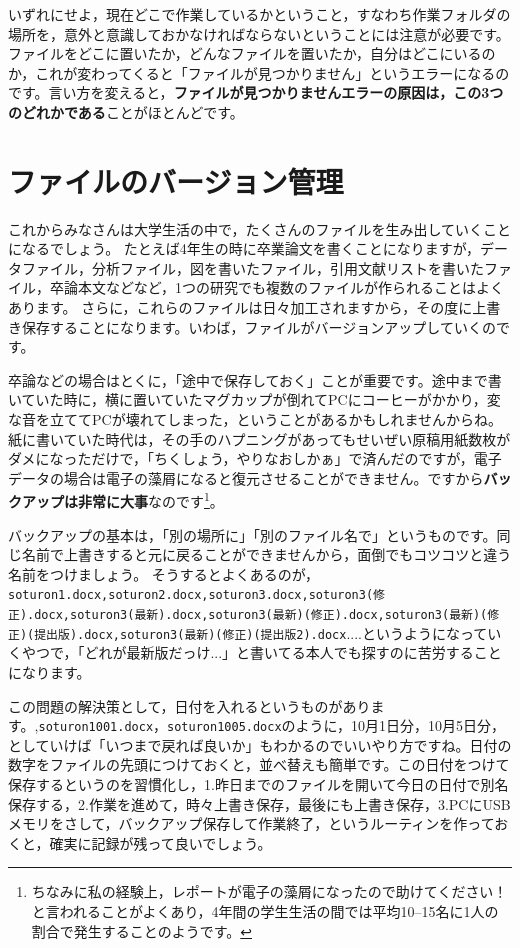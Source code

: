 \documentclass{ltjsbook}
\begin{document}
いずれにせよ，現在どこで作業しているかということ，すなわち作業フォルダの場所を，意外と意識しておかなければならないということには注意が必要です。ファイルをどこに置いたか，どんなファイルを置いたか，自分はどこにいるのか，これが変わってくると「ファイルが見つかりません」というエラーになるのです。言い方を変えると，\textbf{ファイルが見つかりませんエラーの原因は，この3つのどれかである}ことがほとんどです。

\section{ファイルのバージョン管理}
\label{versionControl}
これからみなさんは大学生活の中で，たくさんのファイルを生み出していくことになるでしょう。
たとえば4年生の時に卒業論文を書くことになりますが，データファイル，分析ファイル，図を書いたファイル，引用文献リストを書いたファイル，卒論本文などなど，1つの研究でも複数のファイルが作られることはよくあります。
さらに，これらのファイルは日々加工されますから，その度に上書き保存することになります。いわば，ファイルがバージョンアップしていくのです。

卒論などの場合はとくに，「途中で保存しておく」ことが重要です。途中まで書いていた時に，横に置いていたマグカップが倒れてPCにコーヒーがかかり，変な音を立ててPCが壊れてしまった，ということがあるかもしれませんからね。紙に書いていた時代は，その手のハプニングがあってもせいぜい原稿用紙数枚がダメになっただけで，「ちくしょう，やりなおしかぁ」で済んだのですが，電子データの場合は電子の藻屑になると復元させることができません。ですから\textbf{バックアップは非常に大事}なのです\footnote{ちなみに私の経験上，レポートが電子の藻屑になったので助けてください！と言われることがよくあり，4年間の学生生活の間では平均10--15名に1人の割合で発生することのようです。}。

バックアップの基本は，「別の場所に」「別のファイル名で」というものです。同じ名前で上書きすると元に戻ることができませんから，面倒でもコツコツと違う名前をつけましょう。
そうするとよくあるのが，\verb|soturon1.docx,soturon2.docx,soturon3.docx,soturon3(修正).docx,soturon3(最新).docx,soturon3(最新)(修正).docx,soturon3(最新)(修正)(提出版).docx,soturon3(最新)(修正)(提出版2).docx|....というようになっていくやつで，「どれが最新版だっけ...」と書いてる本人でも探すのに苦労することになります。

この問題の解決策として，日付を入れるというものがあります。,\verb|soturon1001.docx|，\verb|soturon1005.docx|のように，10月1日分，10月5日分，としていけば「いつまで戻れば良いか」もわかるのでいいやり方ですね。日付の数字をファイルの先頭につけておくと，並べ替えも簡単です。この日付をつけて保存するというのを習慣化し，1.昨日までのファイルを開いて今日の日付で別名保存する，2.作業を進めて，時々上書き保存，最後にも上書き保存，3.PCにUSBメモリをさして，バックアップ保存して作業終了，というルーティンを作っておくと，確実に記録が残って良いでしょう。
\end{document}

